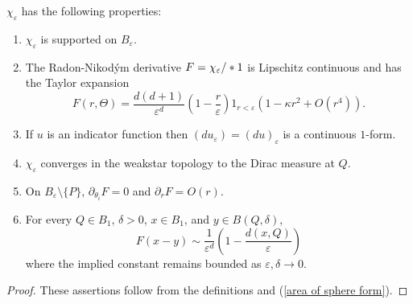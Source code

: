 \begin{lemma}\label{mollifier props}
$\chi_\varepsilon$ has the following properties:
\begin{enumerate}
\item $\chi_\varepsilon$ is supported on $B_\varepsilon$.
\item The Radon-Nikod\'ym derivative $F = \chi_\varepsilon/*1$ is Lipschitz continuous and has the Taylor expansion
\begin{equation}\label{RN mollify}
F(r, \Theta) = \frac{d(d + 1)}{\varepsilon^d} \left(1 - \frac{r}{\varepsilon}\right) 1_{r < \varepsilon}(1 - \kappa r^2 + O(r^4)).
\end{equation}
\item If $u$ is an indicator function then $(du_\varepsilon) = (du)_\varepsilon$ is a continuous $1$-form.
\item $\chi_\varepsilon$ converges in the weakstar topology to the Dirac measure at $Q$.
\item On $B_\varepsilon \setminus \{P\}$, $\partial_{\theta_i} F = 0$ and $\partial_r F = O(r)$.
\item For every $Q \in B_1$, $\delta > 0$, $x \in B_1$, and $y \in B(Q, \delta)$,
\begin{equation}\label{approximation of mollifier 2}
F(x - y) \sim \frac{1}{\varepsilon^d}\left(1 - \frac{d(x, Q)}{\varepsilon}\right)
\end{equation}
where the implied constant remains bounded as $\varepsilon,\delta \to 0$.
\end{enumerate}
\end{lemma}
\begin{proof}
These assertions follow from the definitions and (\ref{area of sphere form}).
\end{proof}

